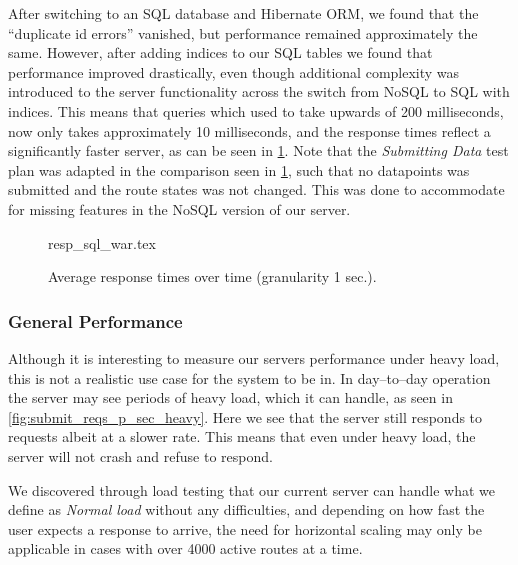 After switching to an SQL database and Hibernate ORM, we found that the \enquote{duplicate id errors} vanished, but performance remained approximately the same.
However, after adding indices to our SQL tables we found that performance improved drastically, even though additional complexity was introduced to the server functionality across the switch from NoSQL to SQL with indices.
This means that queries which used to take upwards of 200 milliseconds, now only takes approximately 10 milliseconds, and the response times reflect a significantly faster server, as can be seen in \cref{fig:nosql_vs_sql}.
Note that the \textit{Submitting Data} test plan was adapted in the comparison seen in \cref{fig:nosql_vs_sql}, such that no datapoints was submitted and the route states was not changed.
This was done to accommodate for missing features in the NoSQL version of our server.

\begin{figure}[!htb]
    \centering
    \footnotesize
    {resp_sql_war.tex}
    \caption{Average response times over time (granularity 1 sec.).}\label{fig:nosql_vs_sql}
\end{figure}

\subsubsection*{General Performance}
Although it is interesting to measure our servers performance under heavy load, this is not a realistic use case for the system to be in.
In day--to--day operation the server may see periods of heavy load, which it can handle, as seen in \cref{fig:submit_reqs_p_sec_heavy}. %
Here we see that the server still responds to requests albeit at a slower rate.
This means that even under heavy load, the server will not crash and refuse to respond.

We discovered through load testing that our current server can handle what we define as \textit{Normal load} without any difficulties, and depending on how fast the user expects a response to arrive, the need for horizontal scaling may only be applicable in cases with over 4000 active routes at a time.
